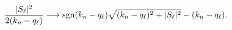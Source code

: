 \begin{equation}
\frac{|S_{\ell}|^2}{2(k_n-q_{\ell})} \longrightarrow {\rm sgn}(k_n-q_{\ell})\sqrt{(k_n-q_{\ell})^2+|S_{\ell}|^2}
-(k_n-q_{\ell})  .
\label{d9}
\end{equation}

